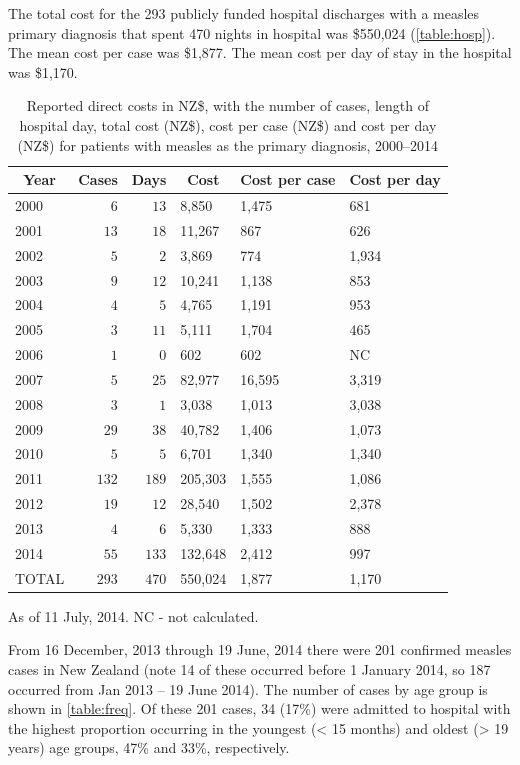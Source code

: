 \documentclass{article}
\begin{document}
The total cost for the 293 publicly funded hospital discharges with a measles primary diagnosis that spent 470 nights in hospital was \$550,024 (\autoref{table:hosp}). The mean cost per case was \$1,877. The mean cost per day of stay in the hospital was \$1,170.



\begin{table}
\caption{Reported direct costs in NZ\$, with the number of cases, length of hospital day, total cost (NZ\$), cost per case (NZ\$) and cost per day (NZ\$) for patients with measles as the primary diagnosis, 2000--2014}
\begin{center}
\begin{tabular}{lrrlll}
\hline\hline
\multicolumn{1}{c}{Year}&\multicolumn{1}{c}{Cases}&\multicolumn{1}{c}{Days}&\multicolumn{1}{c}{Cost}&\multicolumn{1}{c}{Cost per case}&\multicolumn{1}{c}{Cost per day}\tabularnewline
\hline
2000&$  6$&$ 13$&8,850&1,475&681\tabularnewline
2001&$ 13$&$ 18$&11,267&867&626\tabularnewline
2002&$  5$&$  2$&3,869&774&1,934\tabularnewline
2003&$  9$&$ 12$&10,241&1,138&853\tabularnewline
2004&$  4$&$  5$&4,765&1,191&953\tabularnewline
2005&$  3$&$ 11$&5,111&1,704&465\tabularnewline
2006&$  1$&$  0$&602&602&NC\tabularnewline
2007&$  5$&$ 25$&82,977&16,595&3,319\tabularnewline
2008&$  3$&$  1$&3,038&1,013&3,038\tabularnewline
2009&$ 29$&$ 38$&40,782&1,406&1,073\tabularnewline
2010&$  5$&$  5$&6,701&1,340&1,340\tabularnewline
2011&$132$&$189$&205,303&1,555&1,086\tabularnewline
2012&$ 19$&$ 12$&28,540&1,502&2,378\tabularnewline
2013&$  4$&$  6$&5,330&1,333&888\tabularnewline
2014&$ 55$&$133$&132,648&2,412&997\tabularnewline
TOTAL&$293$&$470$&550,024&1,877&1,170\tabularnewline
\hline
\end{tabular}\end{center}\label{table:hosp}
 \centering
 \begin{tablenotes}
      \small
      \item As of 11 July, 2014. NC - not calculated.
    \end{tablenotes}
\end{table}

From 16 December, 2013 through 19 June, 2014 there were 201 confirmed measles cases in New Zealand (note 14 of these occurred before 1 January 2014, so 187 occurred from Jan 2013 -- 19 June 2014). The number of cases by age group is shown in \autoref{table:freq}. Of these 201 cases, 34 (17\%) were admitted to hospital with the highest proportion occurring in the youngest (< 15 months) and oldest (> 19 years) age groups, 47\% and 33\%, respectively.
\end{document}
